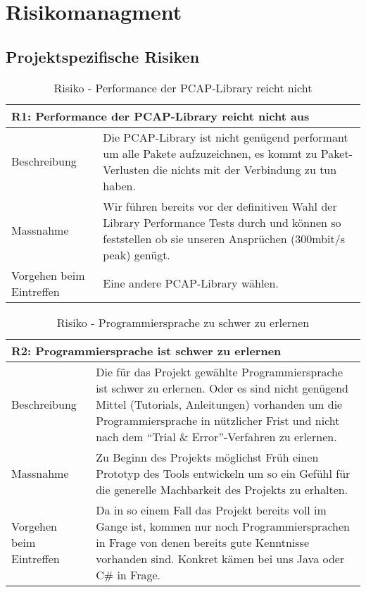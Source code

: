 \section{Risikomanagment}
\label{sec:Risikomanagment}

\subsection{Projektspezifische Risiken}

\begin{table}[H]
\begin{tabularx}{\textwidth}{l|>{\raggedright\arraybackslash}X}
\multicolumn{2}{l}{\textbf{R1: Performance der \ac{PCAP}-Library reicht nicht aus}} \\
\hline
Beschreibung & Die \ac{PCAP}-Library ist nicht genügend performant um alle Pakete aufzuzeichnen, es kommt zu Paket-Verlusten die nichts mit der Verbindung zu tun haben. \\
\hline
Massnahme & Wir führen bereits vor der definitiven Wahl der Library Performance Tests durch und können so feststellen ob sie unseren Ansprüchen (300mbit/s peak) genügt. \\
\hline
Vorgehen beim Eintreffen & Eine andere \ac{PCAP}-Library wählen.\\
\end{tabularx}
\caption{Risiko - Performance der \ac{PCAP}-Library reicht nicht}
\end{table}

\begin{table}[H]
\begin{tabularx}{\textwidth}{l|>{\raggedright\arraybackslash}X}
\multicolumn{2}{l}{\textbf{R2: Programmiersprache ist schwer zu erlernen}} \\
\hline
Beschreibung & Die für das Projekt gewählte Programmiersprache ist schwer zu erlernen. Oder es sind nicht genügend Mittel (Tutorials, Anleitungen) vorhanden um die Programmiersprache in nützlicher Frist und nicht nach dem \enquote{Trial \& Error}-Verfahren zu erlernen.\\
\hline
Massnahme & Zu Beginn des Projekts möglichst Früh einen Prototyp des Tools entwickeln um so ein Gefühl für die generelle Machbarkeit des Projekts zu erhalten.\\
\hline
Vorgehen beim Eintreffen & Da in so einem Fall das Projekt bereits voll im Gange ist, kommen nur noch Programmiersprachen in Frage von denen bereits gute Kenntnisse vorhanden sind. Konkret kämen bei uns Java oder C\# in Frage.\\
\end{tabularx}
\caption{Risiko - Programmiersprache zu schwer zu erlernen}
\end{table}


